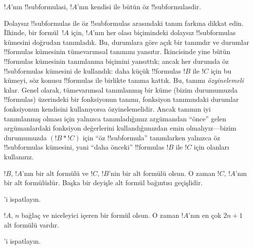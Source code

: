 \begin{defn}[!!^{subformula}]
$!A$'nın !!{subformula}s{}i, $!A$'nın kendisi ile bütün öz
!!{subformula}s{}dir.
\end{defn}

\begin{explain}
Dolaysız !!{subformula}s ile öz !!{subformula}s arasındaki tanım
farkına dikkat edin. İlkinde, bir formül~$!A$ için, $!A$'nın her olası
biçimindeki dolaysız !!{subformula}s kümesini doğrudan tanımladık. Bu,
durumlara göre açık bir tanımdır ve durumlar
!!{formula}s kümesinin tümevarımsal tanımını yansıtır. İkincisinde yine
bütün !!{formula}s kümesinin tanımlanma biçimini yansıttık; ancak her
durumda öz !!{subformula}s kümesini de kullandık: daha küçük
!!{formula}s $!B$ ile $!C$ için bu kümeyi, söz konusu !!{formula}s ile
birlikte tanıma kattık. Bu, tanımı \emph{özyinelemeli}
kılar. Genel olarak, tümevarımsal tanımlanmış bir küme (bizim
durumumuzda !!{formula}s) üzerindeki bir fonksiyonun tanımı, fonksiyon
tanımındaki durumlar fonksiyonun kendisini kullanıyorsa özyinelemelidir.
Ancak tanımın iyi tanımlanmış olması için yalnızca tanımladığımız
argümandan ``önce'' gelen argümanlardaki fonksiyon değerlerini
kullandığımızdan emin olmalıyız---bizim durumumuzda $(!B \ast !C)$ için
``öz !!{subformula}'' tanımlarken yalnızca öz !!{subformula}s kümesini, yani
``daha önceki'' !!{formula}s $!B$ ile $!C$ için olanları kullanırız.
\end{explain}

\begin{prop}
$!B$, $!A$'nın bir alt formülü ve $!C$, $!B$'nin bir alt formülü olsun.
O zaman $!C$, $!A$'nın bir alt formülüdür. Başka bir deyişle alt formül
bağıntısı geçişlidir.
\end{prop}

\begin{prob}
'i ispatlayın.
\end{prob}

\begin{prop}
$!A$, $n$ bağlaç ve niceleyici içeren bir formül olsun. O zaman $!A$'nın
en çok $2n+1$ alt formülü vardır.
\end{prop}

\begin{prob}
'i ispatlayın.
\end{prob}

